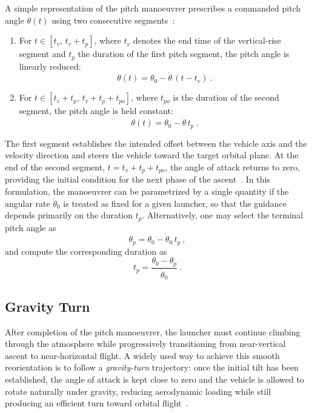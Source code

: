 A simple representation of the pitch manoeuvrer prescribes a commanded pitch angle $\theta(t)$ using two consecutive segments~\cite{teofilatto2025trajectories}:
\begin{enumerate}
  \item For $t \in [t_v,\, t_v+t_p]$, where $t_v$ denotes the end time of the vertical-rise segment and $t_p$ the duration of the first pitch segment, the pitch angle is linearly reduced: 
  \begin{equation}
  \theta(t)=\theta_0-\dot{\theta}\,(t-t_v) \ .
  \end{equation}

  \item For $t \in [t_v+t_p,\, t_v+t_p+t_{po}]$, where $t_{po}$ is the duration of the second segment, the pitch angle is held constant:
  \begin{equation}
  \theta(t)=\theta_0-\dot{\theta}\,t_p \ .
  \end{equation}
\end{enumerate}

The first segment establishes the intended offset between the vehicle axis and the velocity direction and steers the vehicle toward the target orbital plane. At the end of the second segment, $t=t_v+t_p+t_{po}$, the angle of attack returns to zero, providing the initial condition for the next phase of the ascent~\cite{teofilatto2025trajectories}.
In this formulation, the manoeuvrer can be parametrized by a single quantity if the angular rate $\dot{\theta}_0$ is treated as fixed for a given launcher, so that the guidance depends primarily on the duration $t_p$. Alternatively, one may select the terminal pitch angle as~\cite{teofilatto2025trajectories} 
\begin{equation}
\theta_p = \theta_0-\dot{\theta}_0\,t_p \ ,
\end{equation}
and compute the corresponding duration as
\begin{equation}
t_p=\frac{\theta_0-\theta_p}{\dot{\theta}_0} \ .
\end{equation}


\subsection{Gravity Turn}

After completion of the pitch manoeuvrer, the launcher must continue climbing through the atmosphere while progressively transitioning from near-vertical ascent to near-horizontal flight. A widely used way to achieve this smooth reorientation is to follow a \emph{gravity-turn} trajectory: once the initial tilt has been established, the angle of attack is kept close to zero and the vehicle is allowed to rotate naturally under gravity, reducing aerodynamic loading while still producing an efficient turn toward orbital flight~\cite{Ulrich, teofilatto2025trajectories}.

